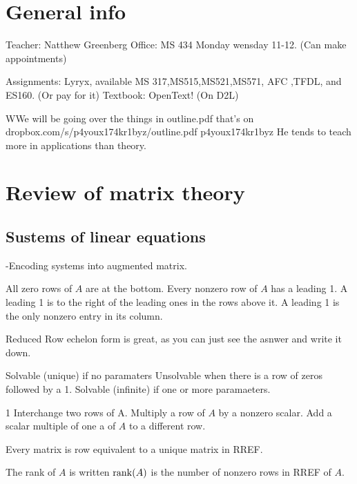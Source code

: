 
\section{General info}
Teacher: Natthew Greenberg
Office: MS 434 Monday wensday 11-12. (Can make appointments)

Assignments: Lyryx, available MS 317,MS515,MS521,MS571, AFC ,TFDL, and ES160. (Or pay for it)
Textbook: OpenText! (On D2L)

WWe will be going over the things in outline.pdf that's on dropbox.com/s/p4youx174kr1byz/outline.pdf
p4youx174kr1byz
	He tends to teach more in applications than theory.

\section{Review of matrix theory}

\subsection{Sustems of linear equations}
-Encoding systems into augmented matrix.
\begin{definition}
All zero rows of $A$ are at the bottom.
Every nonzero row of $A$ has a leading 1.
A leading 1 is to the right of the leading ones in the rows above it.
A leading 1 is the only nonzero entry in its column.
\end{definition}
\begin{remark}
Reduced Row echelon form is great, as you can just see the asnwer and write it down.
\end{remark}
\begin{remark}
Solvable (unique) if no paramaters
Unsolvable when there is a row of zeros followed by a 1.
Solvable (infinite) if one or more paramaeters.
\end{remark}
\begin{definition}
1 Interchange two rows of A.
Multiply a row of $A$ by a nonzero scalar.
Add a scalar multiple of one a of $A$ to a different row.
\end{definition}

\begin{theorem}
Every matrix is row equivalent to a unique matrix in RREF.
\end{theorem}

\begin{definition}[rank]
The rank of $A$ is written $\rank(A)$ is the number of nonzero rows in RREF of $A$.
\end{definition}

